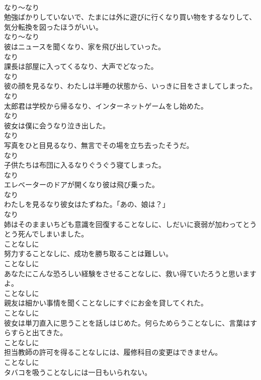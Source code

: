 \documentclass[8pt]{extreport}
\begin{document}
\begin{CJK}{UTF8}{min}
\\	なり～なり	
\\	勉強ばかりしていないで、たまには外に遊びに行くなり買い物をするなりして、気分転換を図ったほうがいい。	
\\	なり～なり	
\\	彼はニュースを聞くなり、家を飛び出していった。	
\\	なり	
\\	課長は部屋に入ってくるなり、大声でどなった。	
\\	なり	
\\	彼の顔を見るなり、わたしは半睡の状態から、いっきに目をさましてしまった。	
\\	なり	
\\	太郎君は学校から帰るなり、インターネットゲームをし始めた。	
\\	なり	
\\	彼女は僕に会うなり泣き出した。	
\\	なり	
\\	写真をひと目見るなり、無言でその場を立ち去ったそうだ。	
\\	なり	
\\	子供たちは布団に入るなりぐうぐう寝てしまった。	
\\	なり	
\\	エレベーターのドアが開くなり彼は飛び乗った。	
\\	なり	
\\	わたしを見るなり彼女はたずねた。「あの、娘は？」	
\\	なり	
\\	姉はそのままいちども意識を回復することなしに、しだいに衰弱が加わってとうとう死んでしまいました。	
\\	ことなしに	
\\	努力することなしに、成功を勝ち取ることは難しい。	
\\	ことなしに	
\\	あなたにこんな恐ろしい経験をさせることなしに、救い得ていたろうと思いますよ。	
\\	ことなしに	
\\	親友は細かい事情を聞くことなしにすぐにお金を貸してくれた。	
\\	ことなしに	
\\	彼女は単刀直入に思うことを話しはじめた。何らためらうことなしに、言葉はすらすらと出てきた。	
\\	ことなしに	
\\	担当教師の許可を得ることなしには、履修科目の変更はできません。	
\\	ことなしに	
\\	タバコを吸うことなしには一日もいられない。	

\end{CJK}
\end{document}
